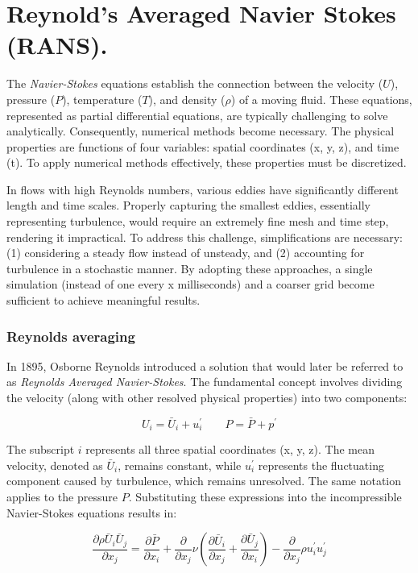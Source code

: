 \section{Reynold's Averaged Navier Stokes (RANS).}
The \textit{Navier-Stokes} equations establish the connection between the
velocity ($U$), pressure ($P$), temperature ($T$), and density ($\rho$) of a
moving fluid. These equations, represented as partial differential equations,
are typically challenging to solve analytically. Consequently, numerical
methods become necessary. The physical properties are functions of four
variables: spatial coordinates (x, y, z), and time (t). To apply numerical
methods effectively, these properties must be discretized. \cite{nasaNS}

In flows with high Reynolds numbers, various eddies have significantly
different length and time scales. Properly capturing the smallest eddies,
essentially representing turbulence, would require an extremely fine mesh and
time step, rendering it impractical. To address this challenge, simplifications
are necessary: (1) considering a steady flow instead of unsteady, and (2)
accounting for turbulence in a stochastic manner. By adopting these approaches,
a single simulation (instead of one every x milliseconds) and a coarser grid
become sufficient to achieve meaningful results.


\subsubsection{Reynolds averaging}
In 1895, Osborne Reynolds introduced a solution that would later be referred to
as \textit{Reynolds Averaged Navier-Stokes}. The fundamental concept involves
dividing the velocity (along with other resolved physical properties) into two
components: \cite{leschziner2015statistical}

\begin{equation}
    U_{i} = \bar U_{i} + u_{i}^{\prime} \qquad
    P = \bar P + p^{\prime}
\end{equation}

\noindent The subscript $i$ represents all three spatial coordinates (x, y, z).
The mean velocity, denoted as $\bar U_{i}$, remains constant, while
$u_{i}^{\prime}$ represents the fluctuating component caused by turbulence,
which remains unresolved. The same notation applies to the pressure $P$.
Substituting these expressions into the incompressible Navier-Stokes equations
results in:

\begin{equation}
    \label{eq:incomp_RANS}
    \frac{\partial \rho \bar U_{i} \bar U_{j}}{\partial x_{j}} =
    \frac{\partial \bar P}{\partial x_{i}} +
    \frac{\partial}{\partial x_{j}} \nu (\frac{\partial 
    \bar U_{i}}{\partial x_{j}} +
    \frac{\partial \bar U_{j}}{\partial x_{i}}) -
    \frac{\partial}{\partial x_{j}} \rho u_{i}^{\prime} u_{j}^{\prime}
\end{equation}

